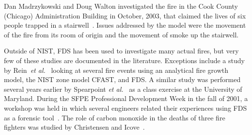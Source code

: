 Dan Madrzykowski and Doug Walton investigated the fire in the Cook County (Chicago) Administration Building in October, 2003, that claimed the lives of six people trapped
in a stairwell~\cite{Cook_County}. Issues addressed by the model were the movement of the fire from its room of origin and the movement of smoke up the stairwell.

Outside of NIST, FDS has been used to investigate many actual fires, but very few of these studies are documented in the literature. Exceptions
include a study by Rein~{\em et al.}~\cite{Rein:Interflam2004} looking at several fire events using an analytical fire growth model, the NIST zone
model CFAST, and FDS. A similar study was performed several years earlier by Spearpoint {\em et al.}~\cite{Spearpoint:ICFRE3} as a class exercise at
the University of Maryland. During the SFPE Professional Development Week in the fall of 2001, a workshop was held in which several engineers related
their experiences using FDS as a forensic tool~\cite{Carpenter:SFPE2001}. The role of carbon monoxide in the deaths of three fire fighters was
studied by Christensen and Icove~\cite{Christensen:JFS}.
